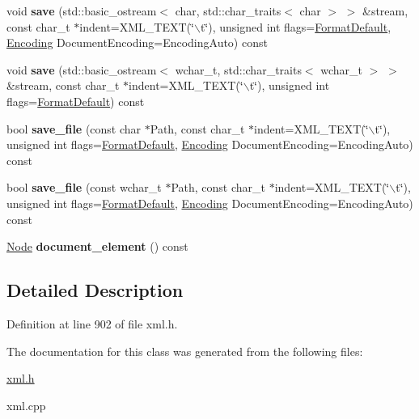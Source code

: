 \begin{DoxyCompactItemize}
\item 
\hypertarget{classphys_1_1xml_1_1Document_a7b59dab683101ad4374b8b9009dbec4a}{
void {\bfseries save} (std::basic\_\-ostream$<$ char, std::char\_\-traits$<$ char $>$ $>$ \&stream, const char\_\-t $\ast$indent=XML\_\-TEXT(\char`\"{}$\backslash$t\char`\"{}), unsigned int flags=\hyperlink{namespacephys_1_1xml_a08bf6aab51f79929d9097706a5e64408}{FormatDefault}, \hyperlink{namespacephys_1_1xml_a420f5de782438f88160321385bea2015}{Encoding} DocumentEncoding=EncodingAuto) const }
\label{dd/d44/classphys_1_1xml_1_1Document_a7b59dab683101ad4374b8b9009dbec4a}

\item 
\hypertarget{classphys_1_1xml_1_1Document_ab0b68aaf634ec540815f6ea99da15d58}{
void {\bfseries save} (std::basic\_\-ostream$<$ wchar\_\-t, std::char\_\-traits$<$ wchar\_\-t $>$ $>$ \&stream, const char\_\-t $\ast$indent=XML\_\-TEXT(\char`\"{}$\backslash$t\char`\"{}), unsigned int flags=\hyperlink{namespacephys_1_1xml_a08bf6aab51f79929d9097706a5e64408}{FormatDefault}) const }
\label{dd/d44/classphys_1_1xml_1_1Document_ab0b68aaf634ec540815f6ea99da15d58}

\item 
\hypertarget{classphys_1_1xml_1_1Document_afae8a9b3d902ee7fb0a349af98a02b1e}{
bool {\bfseries save\_\-file} (const char $\ast$Path, const char\_\-t $\ast$indent=XML\_\-TEXT(\char`\"{}$\backslash$t\char`\"{}), unsigned int flags=\hyperlink{namespacephys_1_1xml_a08bf6aab51f79929d9097706a5e64408}{FormatDefault}, \hyperlink{namespacephys_1_1xml_a420f5de782438f88160321385bea2015}{Encoding} DocumentEncoding=EncodingAuto) const }
\label{dd/d44/classphys_1_1xml_1_1Document_afae8a9b3d902ee7fb0a349af98a02b1e}

\item 
\hypertarget{classphys_1_1xml_1_1Document_aa41f22c3afedd2e24e04218e9350708d}{
bool {\bfseries save\_\-file} (const wchar\_\-t $\ast$Path, const char\_\-t $\ast$indent=XML\_\-TEXT(\char`\"{}$\backslash$t\char`\"{}), unsigned int flags=\hyperlink{namespacephys_1_1xml_a08bf6aab51f79929d9097706a5e64408}{FormatDefault}, \hyperlink{namespacephys_1_1xml_a420f5de782438f88160321385bea2015}{Encoding} DocumentEncoding=EncodingAuto) const }
\label{dd/d44/classphys_1_1xml_1_1Document_aa41f22c3afedd2e24e04218e9350708d}

\item 
\hypertarget{classphys_1_1xml_1_1Document_a481cbf277cfe6d6daf1b66f8d862b88e}{
\hyperlink{classphys_1_1xml_1_1Node}{Node} {\bfseries document\_\-element} () const }
\label{dd/d44/classphys_1_1xml_1_1Document_a481cbf277cfe6d6daf1b66f8d862b88e}

\end{DoxyCompactItemize}


\subsection{Detailed Description}


Definition at line 902 of file xml.h.



The documentation for this class was generated from the following files:\begin{DoxyCompactItemize}
\item 
\hyperlink{xml_8h}{xml.h}\item 
xml.cpp\end{DoxyCompactItemize}
